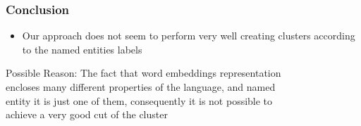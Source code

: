 \documentclass{beamer}
\begin{document}
\begin{frame}
\frametitle{Conclusion}
\begin{itemize} 
\item Our approach does not seem to perform very well creating clusters according to the named entities labels
\end{itemize}

  \hspace{1cm} Possible Reason: The fact that word embeddings representation \\
   \hspace{1cm} encloses many different properties of the language, and named \\
    \hspace{1cm} entity it is just one of them, consequently it is not possible to \\
      \hspace{1cm} achieve a very good cut of the cluster
\end{frame}



 
 
 
\end{document}
